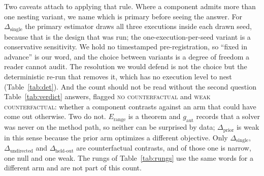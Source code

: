\documentclass[11pt]{article}
\begin{document}
Two caveats attach to applying that rule. Where a component admits more than one nesting variant, we name which is primary before seeing the answer. For
$\Delta_{\mathrm{single}}$ the primary estimator draws all three executions inside each drawn seed, because that
is the design that was run; the one-execution-per-seed variant is a conservative sensitivity. We hold no timestamped pre-registration, so ``fixed in advance'' is our word, and the choice between variants is
a degree of freedom a reader cannot audit. The resolution we would defend is not the choice but the
deterministic re-run that removes it, which has no execution level to nest (Table~\ref{tab:det}). And the count should not be read without the second question
Table~\ref{tab:verdict} answers, flagged \textsc{no counterfactual} and \textsc{weak counterfactual}: whether a
component contrasts against an arm that could have come out otherwise. Two do not. $E_{\mathrm{range}}$ is a
theorem and $g_{\mathrm{aut}}$ records that a solver was never on the method path, so neither can be surprised
by data; $\Delta_{\mathrm{prior}}$ is weak in this sense because the prior arm optimizes a different objective.
Only $\Delta_{\mathrm{single}}$, $\Delta_{\mathrm{undirected}}$ and $\Delta_{\mathrm{held\text{-}out}}$ are
counterfactual contrasts, and of those one is narrow, one null and one weak. The rungs of
Table~\ref{tab:rungs} use the same words for a different arm and are not part of this count.
\end{document}
